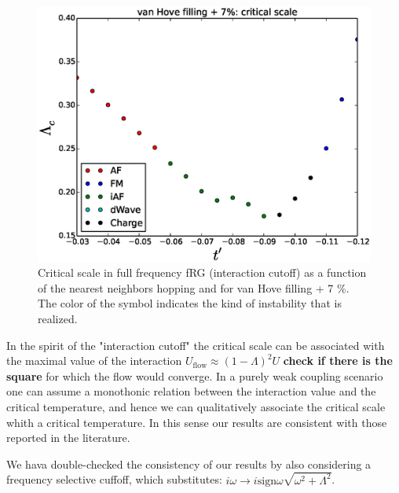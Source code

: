 \begin{figure}
\includegraphics[scale=0.5]{vanHove_plus_scan_critical_lambda_phi.eps}
\caption{Critical scale in full frequency fRG (interaction cutoff) as a function of the nearest neighbors hopping and for van Hove filling + 7 \%. The color of the symbol indicates the kind of instability that is realized.} 
\label{phasediag_van_hove_plus} 
\end{figure}




In the spirit of the "interaction cutoff" the critical scale can be associated with the maximal value of the interaction $U_{\mathrm{flow}}\approx(1-\Lambda)^2 U$ \textbf{check if there is the square} for which the flow would converge. 
In a purely weak coupling scenario one can assume a monothonic relation between the interaction value and the critical temperature, and hence we can qualitatively associate the critical scale whith a critical temperature. In this sense our results are consistent with those reported in the literature. 

We hava double-checked the consistency of our results by also considering a frequency selective cuffoff, which substitutes: $i\omega \rightarrow i\mathrm{sign} \omega \sqrt{\omega^2+\Lambda^2}$. 

